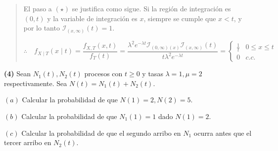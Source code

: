 \documentclass[a4paper, 12pt]{article}
\begin{document}
\begin{quote}
El paso a $(\star)$ se justifica como sigue. Si la región de integración es $(0, t)$ y la variable de
integración es $x$, siempre se cumple que $x < t$, y por lo tanto
$\mathcal{I}_{(x, \infty)}(t) = 1$.

  \begin{equation*}
    \therefore \quad f_{X \mid T}(x\mid t) = \frac{f_{X, T}(x, t)}{f_T(t)} 
    = \frac{\lambda^2 e^{-\lambda t}\mathcal{I}_{(0, \infty)(x)}\mathcal{I}_{(x,
    \infty)}(t)}{t \lambda^2 e^{-\lambda t}} = \begin{cases}
      \frac{1}{t} & 0 \leq x \leq t  \\ 
      0 & c.c.
    \end{cases}
  \end{equation*}

\end{quote}
\normalsize

\pagebreak 

\textbf{(4)} Sean $N_1(t), N_2(t)$ procesos con $t \geq 0$ y tasas $\lambda = 1,
\mu = 2$ respectivamente. Sea $N(t) = N_1(t) + N_2(t)$. 

$(a)$ Calcular la probabilidad de que $N(1) = 2, N(2) = 5$.

$(b)$ Calcular la probabilidad de que $N_1(1) = 1$ dado $N(1) = 2$.

$(c)$ Calcular la probabilidad de que el segundo arribo en $N_1$ ocurra antes
que el tercer arribo en $N_2(t)$.
\end{document}
